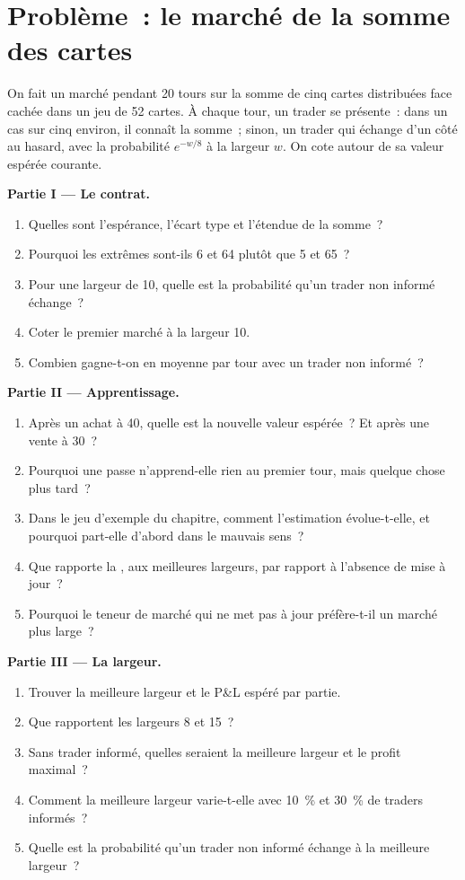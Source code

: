 \section{Problème~: le marché de la somme des cartes}

\begin{problem}\label{pb:m2:market-making-games:1}
On fait un marché pendant 20 tours sur la somme de cinq cartes distribuées face cachée
dans un jeu de 52 cartes. À chaque tour, un trader se présente~: dans un cas sur cinq environ, il connaît la somme~; sinon,
un trader qui échange d'un côté au hasard, avec la probabilité $e^{-w/8}$ à la largeur $w$. On cote
autour de sa valeur espérée courante.

\medskip\noindent\textbf{Partie I --- Le contrat.}
\begin{enumerate}
\item Quelles sont l'espérance, l'écart type et l'étendue de la somme~?
\item Pourquoi les extrêmes sont-ils 6 et 64 plutôt que 5 et 65~?
\item Pour une largeur de 10, quelle est la probabilité qu'un trader non informé échange~?
\item Coter le premier marché à la largeur 10.
\item Combien gagne-t-on en moyenne par tour avec un trader non informé~?
\end{enumerate}

\medskip\noindent\textbf{Partie II --- Apprentissage.}
\begin{enumerate}[resume]
\item Après un achat à 40, quelle est la nouvelle valeur espérée~? Et après une vente à 30~?
\item Pourquoi une passe n'apprend-elle rien au premier tour, mais quelque chose plus tard~?
\item Dans le jeu d'exemple du chapitre, comment l'estimation évolue-t-elle, et pourquoi part-elle d'abord
dans le mauvais sens~?
\item Que rapporte la , aux meilleures largeurs, par rapport à l'absence de mise à jour~?
\item Pourquoi le teneur de marché qui ne met pas à jour préfère-t-il un marché plus large~?
\end{enumerate}

\medskip\noindent\textbf{Partie III --- La largeur.}
\begin{enumerate}[resume]
\item Trouver la meilleure largeur et le P\&L espéré par partie.
\item Que rapportent les largeurs 8 et 15~?
\item Sans trader informé, quelles seraient la meilleure largeur et le profit maximal~?
\item Comment la meilleure largeur varie-t-elle avec 10~\% et 30~\% de traders informés~?
\item Quelle est la probabilité qu'un trader non informé échange à la meilleure largeur~?
\end{enumerate}


\end{problem}
